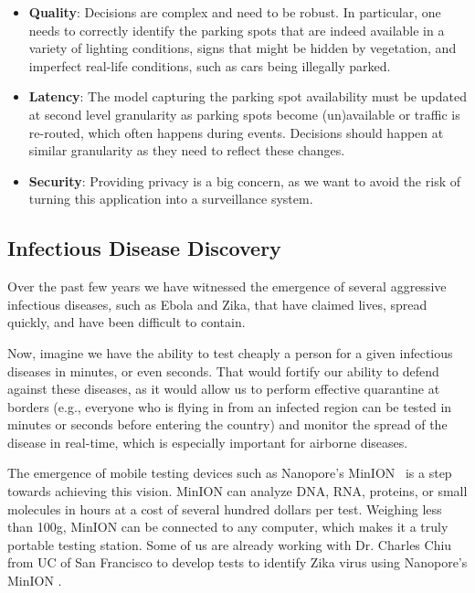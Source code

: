 \begin{itemize}[noitemsep,topsep=0pt,parsep=0pt,partopsep=0pt]
\item {\bf Quality}: Decisions are complex and need to be robust. In particular, one needs to correctly identify the parking spots that are indeed available in a variety of lighting conditions, signs that might be hidden by vegetation, and imperfect real-life conditions, such as cars being illegally parked.
\item {\bf Latency}: The model capturing the parking spot availability must be updated at second level granularity as parking spots become (un)available or traffic is re-routed, which often happens during events. Decisions should happen at similar granularity as they need to reflect these changes.
\item {\bf Security}: Providing privacy is a big concern, as we want to avoid the risk of turning this application into a surveillance system.
\end{itemize}

\subsection{Infectious Disease Discovery}

Over the past few years we have witnessed the emergence of several aggressive infectious diseases, such as Ebola and Zika, that have claimed lives, spread quickly, and have been difficult to contain. 

Now, imagine  we have the ability to test cheaply a person for a given infectious diseases in minutes, or even seconds. That would fortify our ability to defend against these diseases, as it would allow us to perform effective quarantine at borders (e.g., everyone who is flying in from an infected region can be tested in minutes or seconds before entering the country) and monitor the spread of the disease in real-time, which is especially important for airborne diseases.

The emergence of mobile testing devices such as Nanopore's MinION~\cite{minion} is a step towards achieving this vision. MinION can analyze DNA, RNA, proteins, or small molecules in hours at a cost of several hundred dollars per test. Weighing less than 100g, MinION can be connected to any computer, which makes it a truly portable testing station. Some of us are already working with Dr. Charles Chiu from UC of San Francisco to develop tests to identify Zika virus using Nanopore's MinION . 

